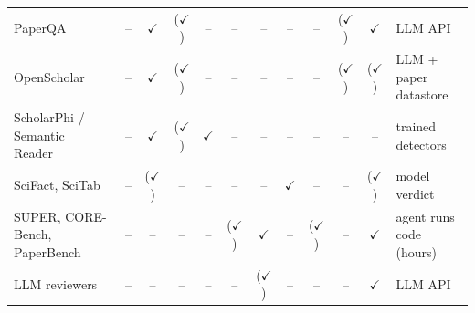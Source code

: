 \documentclass[conference]{IEEEtran}
\newcommand{\yes}{$\checkmark$}
\newcommand{\no}{--}
\newcommand{\part}{($\checkmark$)}
\begin{document}
\begin{table}[t]
{\begin{tabular}{@{}lccccccccccl@{}}
PaperQA~\cite{lala2023paperqa} & \no & \yes & \part & \no & \no & \no & \no & \no & \part & \yes & LLM API \\
OpenScholar~\cite{asai2026openscholar} & \no & \yes & \part & \no & \no & \no & \no & \no & \part & \part & LLM + paper datastore \\
ScholarPhi / Semantic Reader~\cite{head2021scholarphi,lo2024semanticreader} & \no & \yes & \part & \yes & \no & \no & \no & \no & \no & \no & trained detectors \\
SciFact, SciTab~\cite{wadden2020scifact,lu2023scitab} & \no & \part & \no & \no & \no & \no & \yes & \no & \no & \part & model verdict \\
SUPER, CORE-Bench, PaperBench~\cite{bogin2024super,siegel2024corebench,starace2025paperbench} & \no & \no & \no & \no & \part & \yes & \no & \part & \no & \yes & agent runs code (hours) \\
LLM reviewers~\cite{liang2024feedback} & \no & \no & \no & \no & \no & \part & \no & \no & \no & \yes & LLM API \\

\end{tabular}}
\end{table}
\end{document}
